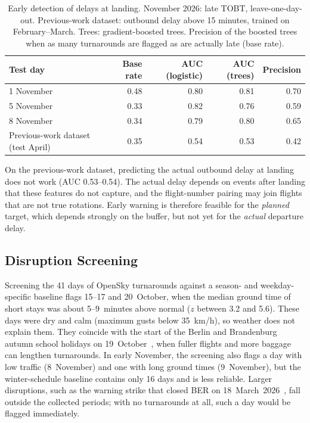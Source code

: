 \begin{table}[htbp]\centering\footnotesize
\begin{tabular}{lrrrr}\hline
Test day & Base rate & AUC (logistic) & AUC (trees) & Precision\\\hline
1 November & 0.48 & 0.80 & 0.81 & 0.70\\
5 November & 0.33 & 0.82 & 0.76 & 0.59\\
8 November & 0.34 & 0.79 & 0.80 & 0.65\\\hline
Previous-work dataset (test April) & 0.35 & 0.54 & 0.53 & 0.42\\\hline
\end{tabular}
\caption{Early detection of delays at landing. November 2026: late TOBT, leave-one-day-out. Previous-work dataset: outbound delay above 15 minutes, trained on February--March. Trees: gradient-boosted trees. Precision of the boosted trees when as many turnarounds are flagged as are actually late (base rate).}
\label{tab:earlywarning}
\end{table}

On the previous-work dataset, predicting the actual outbound delay at landing does not work (AUC 0.53--0.54). The actual delay depends on events after landing that these features do not capture, and the flight-number pairing may join flights that are not true rotations. Early warning is therefore feasible for the \emph{planned} target, which depends strongly on the buffer, but not yet for the \emph{actual} departure delay.

\subsection{Disruption Screening}
Screening the 41 days of OpenSky turnarounds against a season- and weekday-specific baseline flags 15--17 and 20~October, when the median ground time of short stays was about 5--9~minutes above normal ($z$ between 3.2 and 5.6). These days were dry and calm (maximum gusts below 35~km/h), so weather does not explain them. They coincide with the start of the Berlin and Brandenburg autumn school holidays on 19~October~\cite{herbstferien2026}, when fuller flights and more baggage can lengthen turnarounds. In early November, the screening also flags a day with low traffic (8~November) and one with long ground times (9~November), but the winter-schedule baseline contains only 16 days and is less reliable. Larger disruptions, such as the warning strike that closed BER on 18~March~2026~\cite{aerointernational2026streik}, fall outside the collected periods; with no turnarounds at all, such a day would be flagged immediately.

